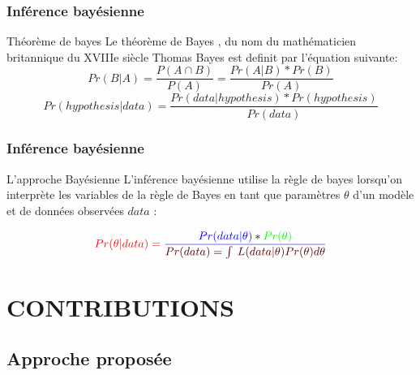 \documentclass[aspectratio=169,professionalfonts, 12pt]{beamer}
\begin{document}
\begin{frame}
  \frametitle{Inférence bayésienne}
  \justifying 
  \begin{minipage}{\textwidth}
  \begin{block}{Théorème de bayes}
    Le théorème de Bayes , du nom du mathématicien britannique du XVIIIe siècle Thomas Bayes est definit par l'équation suivante:   
    \begin{equation}
      Pr(B|A) = \frac{P(A\cap B)}{P(A)} = \frac{Pr(A|B)*Pr(B)}{Pr(A)}
      \label{theoreme_bayes}
    \end{equation} 
    \begin{equation}
      Pr(hypothesis|data) = \frac{Pr(data|hypothesis)*Pr(hypothesis)}{Pr(data)}
      \label{theoreme_bayes2}
    \end{equation}
  \end{block}
  \end{minipage} 
\end{frame}


\begin{frame}
  \frametitle{Inférence bayésienne}
  \justifying 
  \begin{minipage}{\textwidth}
  \begin{block}{L’approche Bayésienne}
    L'inférence bayésienne utilise la règle de bayes lorsqu’on interprète les variables de la règle de Bayes en tant que paramètres \(\displaystyle \theta \) d'un modèle et de données observées \(\displaystyle data \) : 
  \end{block}
  \end{minipage}
  \begin{minipage}{\textwidth}
    \centering
    \begin{equation}
      \color{red} Pr(\theta|data) = \color{blue} \frac{Pr(data|\theta)\color{black} * \color{green}Pr(\theta)}{ \color{blueforest} Pr(data) =  \int_{}^{}  \,L(data|\theta)Pr(\theta)d\theta }
      \label{theoreme_bayes3}
    \end{equation}
  \end{minipage}
\end{frame}


\section{CONTRIBUTIONS}

\subsection{Approche proposée}
\end{document}
